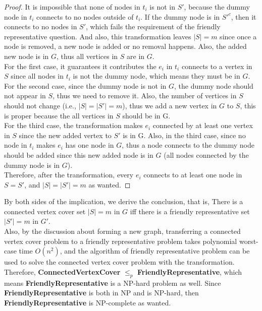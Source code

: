 \documentclass[10pt]{article}
\begin{document}
\begin{mdframed}
\begin{itemize}
\begin{proof}
            It is impossible that none of nodes in $t_i$ is not in $S'$, because the dummy node in $t_i$ connects to no nodes outside of $t_i$. If the dummy node is in $S'^c$, then it connects to no nodes in $S'$, which fails the requirement of the friendly representative question. And also, this transformation leaves $|S| = m$ since once a node is removed, a new node is added or no removal happens. Also, the added new node is in $G$, thus all vertices in $S$ are in $G$.\\
           For the first case, it guarantees it contributes the $e_i$ in $t_i$ connects to a vertex in $S$ since all nodes in $t_i$ is not the dummy node, which means they must be in $G$.\\
           For the second case, since the dummy node is not in $G$, the dummy node should not appear in $S$, thus we need to remove it. Also, the number of vertices in $S$ should not change (i.e., $|S| = |S'| = m$), thus we add a new vertex in $G$ to $S$, this is proper because the all vertices in $S$ should be in G.\\
           For the third case, the transformation makes $e_i$ connected by at least one vertex in $S$ since the new added vertex to $S'$ is in G. Also, in the third case, since no node in $t_i$ makes $e_i$ has one node in $G$, thus a node connects to the dummy node should be added since this new added node is in $G$ (all nodes connected by the dummy node is in $G$).\\
           Therefore, after the transformation, every $e_i$ connects to at least one node in $S = S'$, and $|S| = |S'| = m$ as wanted.
            \end{proof}
        \end{itemize}
        By both sides of the implication, we derive the conclusion, that is, There is a connected vertex cover set $|S| = m$ in $G$ iff there is a friendly representative set $|S'| = m$ in $G'$.\\
        Also, by the discussion about forming a new graph, transferring a connected vertex cover problem to a friendly representative problem takes polynomial worst-case time $O(n^2)$, and the algorithm of friendly representative problem can be used to solve the connected vertex cover problem with the transformation. Therefore, \textbf{ConnectedVertexCover} $\leq_p$ \textbf{FriendlyRepresentative}, which means \textbf{FriendlyRepresentative} is a NP-hard problem as well. Since \textbf{FriendlyRepresentative} is both in NP and is NP-hard, then \textbf{FriendlyRepresentative} is NP-complete as wanted.
    \end{mdframed}
\end{document}
